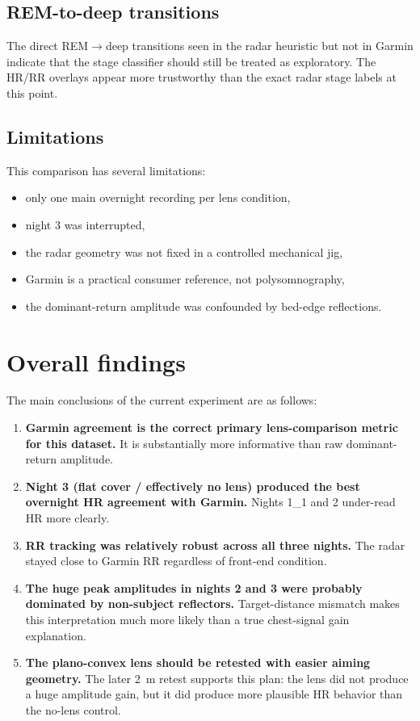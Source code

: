\documentclass[11pt,a4paper]{article}
\begin{document}
\subsection{REM-to-deep transitions}
The direct REM$\rightarrow$deep transitions seen in the radar heuristic but not in Garmin indicate that the stage classifier should still be treated as exploratory. The HR/RR overlays appear more trustworthy than the exact radar stage labels at this point.

\subsection{Limitations}
This comparison has several limitations:
\begin{itemize}
    \item only one main overnight recording per lens condition,
    \item night 3 was interrupted,
    \item the radar geometry was not fixed in a controlled mechanical jig,
    \item Garmin is a practical consumer reference, not polysomnography,
    \item the dominant-return amplitude was confounded by bed-edge reflections.
\end{itemize}

\section{Overall findings}
The main conclusions of the current experiment are as follows:
\begin{enumerate}
    \item \textbf{Garmin agreement is the correct primary lens-comparison metric for this dataset.} It is substantially more informative than raw dominant-return amplitude.
    \item \textbf{Night 3 (flat cover / effectively no lens) produced the best overnight HR agreement with Garmin.} Nights 1\_1 and 2 under-read HR more clearly.
    \item \textbf{RR tracking was relatively robust across all three nights.} The radar stayed close to Garmin RR regardless of front-end condition.
    \item \textbf{The huge peak amplitudes in nights 2 and 3 were probably dominated by non-subject reflectors.} Target-distance mismatch makes this interpretation much more likely than a true chest-signal gain explanation.
    \item \textbf{The plano-convex lens should be retested with easier aiming geometry.} The later \SI{2}{m} retest supports this plan: the lens did not produce a huge amplitude gain, but it did produce more plausible HR behavior than the no-lens control.
\end{enumerate}
\end{document}

